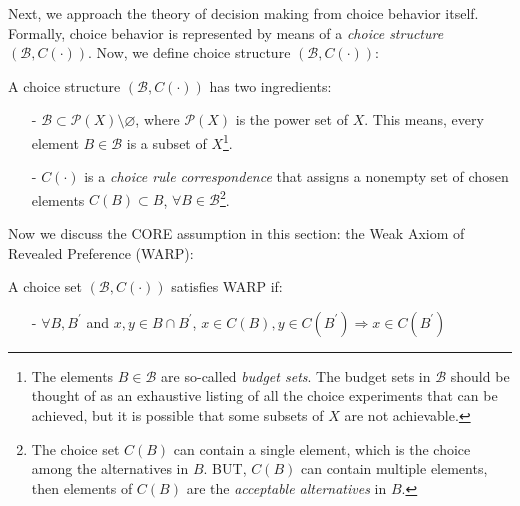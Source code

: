 Next, we approach the theory of decision making from choice behavior itself. Formally, choice behavior is represented by means of a \textit{choice structure} $(\mathcal{B},C(\cdot))$. Now, we define choice structure $(\mathcal{B},C(\cdot))$:
\begin{definition}
    A choice structure $(\mathcal{B},C(\cdot))$ has two ingredients:
    \begin{enumerate}
        \item[-] $\mathcal{B}\subset \mathcal{P}(X)\setminus\varnothing$, where $\mathcal{P}(X)$ is the power set of $X$. This means, every element $B\in \mathcal{B}$ is a subset of $X$\footnote{The elements $B\in\mathcal{B}$ are so-called \textit{budget sets}. The budget sets in $\mathcal{B}$ should be thought of as an exhaustive listing of all the choice experiments that can be achieved, but it is possible that some subsets of $X$ are not achievable.}.
        \item[-] $C(\cdot)$ is a \textit{choice rule correspondence} that assigns a nonempty set of chosen elements $C(B)\subset B$, $\forall B\in \mathcal{B}$\footnote{The choice set $C(B)$ can contain a single element, which is the choice among the alternatives in $B$. BUT, $C(B)$ can contain multiple elements, then elements of $C(B)$ are the \textit{acceptable alternatives} in $B$.}.
    \end{enumerate}
\end{definition}

Now we discuss the CORE assumption in this section: the Weak Axiom of Revealed Preference (WARP):
\begin{definition}
    A choice set $(\mathcal{B},C(\cdot))$ satisfies WARP if:
    \begin{enumerate}
        \item[-] $\forall B,B^{\prime}$ and $x,y\in B\cap B^{\prime}$, $x\in C(B),y\in C(B^{\prime})\Rightarrow x\in C(B^{\prime})$
    \end{enumerate}
\end{definition}